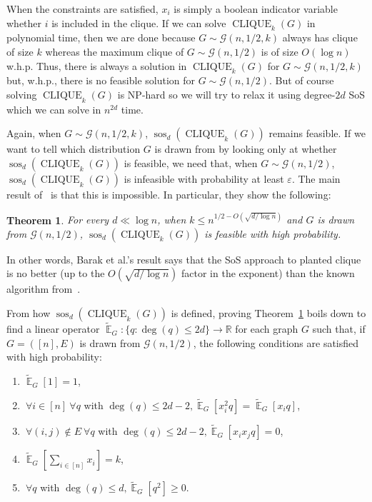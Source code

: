\documentclass{article}[11pt]
\DeclareMathOperator{\sos}{sos}
\DeclareMathOperator{\cli}{CLIQUE}
\newcommand{\cG}{\mathcal{G}}
\newcommand{\E}{\mathop{\mathbb{E}}}
\newcommand{\tE}{\tilde{\E}}
\newtheorem{theorem}{Theorem}
\let\Oldforall\forall
\renewcommand{\forall}{~\Oldforall} %
\newcounter{theorem-preserve}
\begin{document}
When the constraints are satisfied, $x_i$ is simply a boolean indicator variable whether $i$ is included in the clique. If we can solve $\cli_k(G)$ in polynomial time, then we are done because $G \sim \cG(n, 1/2, k)$ always has clique of size $k$ whereas the maximum clique of $G \sim \cG(n, 1/2)$ is of size $O(\log n)$ w.h.p. Thus, there is always a solution in $\cli_k(G)$ for $G \sim \cG(n, 1/2, k)$ but, w.h.p., there is no feasible solution for $G \sim \cG(n, 1/2)$. But of course solving $\cli_k(G)$ is NP-hard so we will try to relax it using degree-$2d$ SoS which we can solve in $n^{2d}$ time.

Again, when $G \sim \cG(n, 1/2, k)$, $\sos_d(\cli_k(G))$ remains feasible. If we want to tell which distribution $G$ is drawn from by looking only at whether $\sos_d(\cli_k(G))$ is feasible, we need that, when $G \sim \cG(n, 1/2)$, $\sos_d(\cli_k(G))$ is infeasible with probability at least $\varepsilon$. The main result of~\cite{BHKKMP16} is that this is impossible. In particular, they show the following:

\begin{theorem} \label{thm:main-clique}
For every $d \ll \log n$, when $k \leq n^{1/2 - O(\sqrt{d/\log n})}$ and $G$ is drawn from $\cG(n, 1/2)$, $\sos_d(\cli_k(G))$ is feasible with high probability.
\end{theorem}

In other words, Barak et al.'s result says that the SoS approach to planted clique is no better (up to the $O(\sqrt{d/\log n})$ factor in the exponent) than the known algorithm from~\cite{AKS98}.

From how $\sos_d(\cli_k(G))$ is defined, proving Theorem~\ref{thm:main-clique}
boils down to find a linear operator ${\tE}_G: \{q: \deg(q) \leq 2d\} \rightarrow \mathbb{R}$ for each graph $G$ such that, if $G = ([n], E)$ is drawn from $\cG(n, 1/2)$, the following conditions are satisfied with high probability:
\begin{enumerate}
\item $\tE_G[1] = 1$,
\item $\forall i \in [n] \forall q$ with $ \deg(q) \leq 2d - 2, \tE_G[x_i^2q] = \tE_G[x_iq]$,
\item $\forall (i, j) \notin E \forall q$ with $\deg(q) \leq 2d - 2,\tE_G[x_ix_jq] = 0$,
\item $\tE_G[\sum_{i \in [n]} x_i] = k$,
\item $\forall q$ with $\deg(q) \leq d, \tE_G[q^2] \geq 0$.
\end{enumerate}
\end{document}
